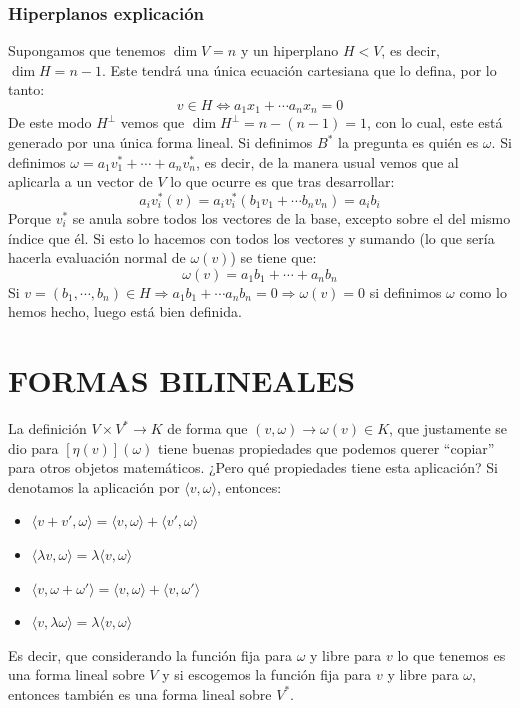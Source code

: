 \documentclass[10pt,a4paper,openright]{book}
\theoremstyle{break}
\begin{document}
\subsubsection{Hiperplanos explicación}
Supongamos que tenemos $\dim V=n$ y un hiperplano $H<V$, es decir, $\dim H=n-1$. Este tendrá una única ecuación cartesiana que lo defina, por lo tanto:
$$v\in H\Leftrightarrow a_1x_1+\cdots a_nx_n=0$$
De este modo $H^\perp$ vemos que $\dim H^\perp = n-(n-1)=1$, con lo cual, este está generado por una única forma lineal. Si definimos $B^*$ la pregunta es quién es $\omega$. Si definimos $\omega=a_1v_1^*+\cdots + a_nv_n^*$, es decir, de la manera usual vemos que al aplicarla a un vector de $V$ lo que ocurre es que tras desarrollar:
$$a_iv_i^*(v) = a_iv_i^*(b_1v_1+\cdots b_nv_n)=a_ib_i$$
Porque $v_i^*$ se anula sobre todos los vectores de la base, excepto sobre el del mismo índice que él. Si esto lo hacemos con todos los vectores y sumando (lo que sería hacerla evaluación normal de $\omega(v)$) se tiene que:
$$\omega(v)=a_1b_1+\cdots +a_nb_n$$
Si $v=(b_1, \cdots, b_n)\in H\Rightarrow a_1b_1+\cdots a_nb_n=0\Rightarrow \omega(v)=0$ si definimos $\omega$ como lo hemos hecho, luego está bien definida.

\section{FORMAS BILINEALES}
La definición $V\times V^* \rightarrow K$ de forma que $(v,\omega)\rightarrow \omega(v)\in K$, que justamente se dio para $\left[\eta(v)\right](\omega)$ tiene buenas propiedades que podemos querer ``copiar'' para otros objetos matemáticos. ¿Pero qué propiedades tiene esta aplicación? Si denotamos la aplicación por $\langle v,\omega\rangle$, entonces:
\begin{itemize}
\item $\langle v+v',\omega\rangle=\langle v,\omega\rangle+\langle v',\omega\rangle$
\item $\langle\lambda v,\omega\rangle = \lambda \langle v,\omega\rangle$
\item $\langle v,\omega+\omega'\rangle =\langle v,\omega\rangle+\langle v,\omega'\rangle$
\item $\langle v,\lambda\omega\rangle = \lambda \langle v,\omega\rangle$
\end{itemize}
Es decir, que considerando la función fija para $\omega$ y libre para $v$ lo que tenemos es una forma lineal sobre $V$ y si escogemos la función fija para $v$ y libre para $\omega$, entonces también es una forma lineal sobre $V^*$.
\end{document}
